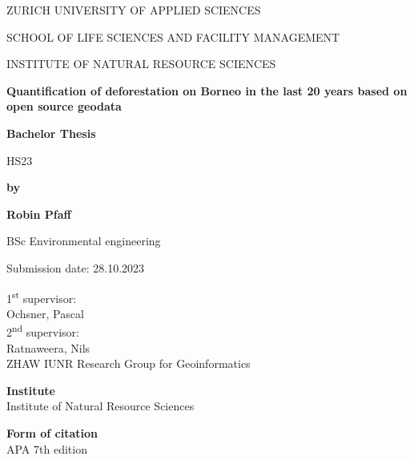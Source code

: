 \documentclass[
  letterpaper,
  DIV=11,
  numbers=noendperiod]{scrreprt}
\author{Robin Pfaff}
\date{2023-06-27}
\begin{document}
\begin{titlepage}
    \centering
    {\fontsize{12}{10}\selectfont ZURICH UNIVERSITY OF APPLIED SCIENCES\par}
    {\fontsize{12}{10}\selectfont SCHOOL OF LIFE SCIENCES AND FACILITY MANAGEMENT\par}
    {\fontsize{12}{10}\selectfont INSTITUTE OF NATURAL RESOURCE SCIENCES\par}
    \vspace{6cm}
    {\fontsize{14}{16}\bfseries Quantification of deforestation on Borneo in the last 20 years based on open source geodata\par}
    {\fontsize{12}{14}\bfseries Bachelor Thesis\par}
    {\fontsize{12}{14}\selectfont HS23\par}
    \vspace{2cm}
    {\fontsize{12}{14}\bfseries by\par}
    {\fontsize{12}{14}\bfseries Robin Pfaff\par}
    {\fontsize{12}{14}\selectfont BSc Environmental engineering\par}
    \vspace{2cm}
    {\fontsize{12}{14}\selectfont Submission date: 28.10.2023\par}

    \vfill
    \begin{flushleft}
        1\textsuperscript{st} supervisor:\\
        Ochsner, Pascal\\
        2\textsuperscript{nd} supervisor:\\
        Ratnaweera, Nils\\
        ZHAW IUNR Research Group for Geoinformatics
    \end{flushleft}
\end{titlepage}

\clearpage
{}
\setcounter{page}{1}

\thispagestyle{empty}
\vspace*{\fill}


\vspace{0.5cm}

\noindent\textbf{Institute}\\
Institute of Natural Resource Sciences

\noindent\textbf{Form of citation}\\
APA 7th edition
\end{document}
